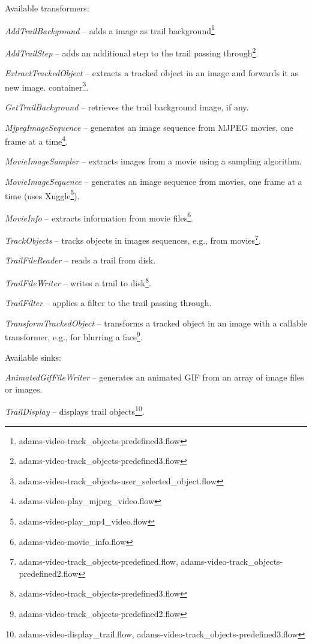 \documentclass[a4paper]{book}
\begin{document}
\noindent Available transformers:
\begin{tight_itemize}
	\item \textit{AddTrailBackground} -- adds a image as trail
	background\footnote{adams-video-track\_objects-predefined3.flow}
	\item \textit{AddTrailStep} -- adds an additional step to the trail
	passing through\footnote{adams-video-track\_objects-predefined3.flow}.
	\item \textit{ExtractTrackedObject} -- extracts a tracked
	object in an image and forwards it as new image.
	container\footnote{adams-video-track\_objects-user\_selected\_object.flow}.
	\item \textit{GetTrailBackground} -- retrieves the trail background image, if any.
	\item \textit{MjpegImageSequence} -- generates an image sequence
	from MJPEG movies, one frame at a time\footnote{adams-video-play\_mjpeg\_video.flow}.
	\item \textit{MovieImageSampler} -- extracts images from a movie using a sampling algorithm.
	\item \textit{MovieImageSequence} -- generates an image sequence
	from movies, one frame at a time (uses Xuggle\cite{xuggle}\footnote{adams-video-play\_mp4\_video.flow}).
	\item \textit{MovieInfo} -- extracts information from movie files\footnote{adams-video-movie\_info.flow}.
	\item \textit{TrackObjects} -- tracks objects in images sequences,
	e.g., from movies\footnote{adams-video-track\_objects-predefined.flow, adams-video-track\_objects-predefined2.flow}.
	\item \textit{TrailFileReader} -- reads a trail from disk.
	\item \textit{TrailFileWriter} -- writes a trail to disk\footnote{adams-video-track\_objects-predefined3.flow}.
	\item \textit{TrailFilter} -- applies a filter to the trail passing through.
	\item \textit{TransformTrackedObject} -- transforms a tracked
	object in an image with a callable transformer, e.g., for blurring a
	face\footnote{adams-video-track\_objects-predefined2.flow}.
\end{tight_itemize}

\noindent Available sinks:
\begin{tight_itemize}
  \item \textit{AnimatedGifFileWriter} -- generates an animated GIF from
  an array of image files or images.
  \item \textit{TrailDisplay} -- displays trail objects\footnote{adams-video-display\_trail.flow, adams-video-track\_objects-predefined3.flow}.
\end{tight_itemize}
\end{document}

